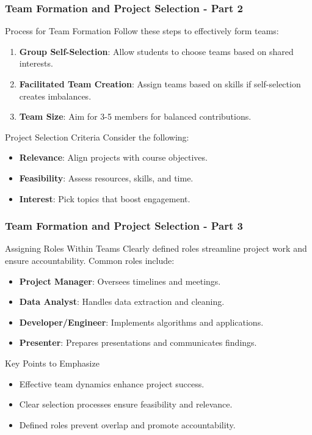 \documentclass{beamer}
\begin{document}
\begin{frame}[fragile]
    \frametitle{Team Formation and Project Selection - Part 2}
    \begin{block}{Process for Team Formation}
        Follow these steps to effectively form teams:
    \end{block}
    \begin{enumerate}
        \item \textbf{Group Self-Selection}: Allow students to choose teams based on shared interests.
        \item \textbf{Facilitated Team Creation}: Assign teams based on skills if self-selection creates imbalances.
        \item \textbf{Team Size}: Aim for 3-5 members for balanced contributions.
    \end{enumerate}
    \begin{block}{Project Selection Criteria}
        Consider the following:
    \end{block}
    \begin{itemize}
        \item \textbf{Relevance}: Align projects with course objectives.
        \item \textbf{Feasibility}: Assess resources, skills, and time.
        \item \textbf{Interest}: Pick topics that boost engagement.
    \end{itemize}
\end{frame}

\begin{frame}[fragile]
    \frametitle{Team Formation and Project Selection - Part 3}
    \begin{block}{Assigning Roles Within Teams}
        Clearly defined roles streamline project work and ensure accountability. Common roles include:
    \end{block}
    \begin{itemize}
        \item \textbf{Project Manager}: Oversees timelines and meetings.
        \item \textbf{Data Analyst}: Handles data extraction and cleaning.
        \item \textbf{Developer/Engineer}: Implements algorithms and applications.
        \item \textbf{Presenter}: Prepares presentations and communicates findings.
    \end{itemize}
    \begin{block}{Key Points to Emphasize}
        \begin{itemize}
            \item Effective team dynamics enhance project success.
            \item Clear selection processes ensure feasibility and relevance.
            \item Defined roles prevent overlap and promote accountability.
        \end{itemize}
    \end{block}
\end{frame}
\end{document}
